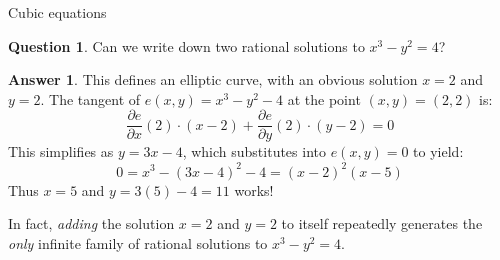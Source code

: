 \documentclass[10pt]{beamer}
\theoremstyle{definition}
\newtheorem{answer}{Answer}
\newtheorem{question}{Question}
\begin{document}
\begin{frame}[t]{Cubic equations}

\begin{question}
Can we write down two rational solutions to $ x^3 - y^2 = 4 $?
\end{question}

\begin{answer}
This defines an elliptic curve, with an obvious solution $ x = 2 $ and $ y = 2 $. The tangent of $ e(x, y) = x^3 - y^2 - 4 $ at the point $ (x, y) = (2, 2) $ is:
$$ \dfrac{\partial e}{\partial x}(2) \cdot (x - 2) + \dfrac{\partial e}{\partial y}(2) \cdot (y - 2) = 0 $$
This simplifies as $ y = 3x - 4 $, which substitutes into $ e(x, y) = 0 $ to yield:
$$ 0 = x^3 - (3x - 4)^2 - 4 = (x - 2)^2(x - 5) $$
Thus $ x = 5 $ and $ y = 3(5) - 4 = 11 $ works!
\end{answer}

\vspace{0.5cm} In fact, \emph{adding} the solution $ x = 2 $ and $ y = 2 $ to itself repeatedly generates the \emph{only} infinite family of rational solutions to $ x^3 - y^2 = 4 $.

\end{frame}
\end{document}

